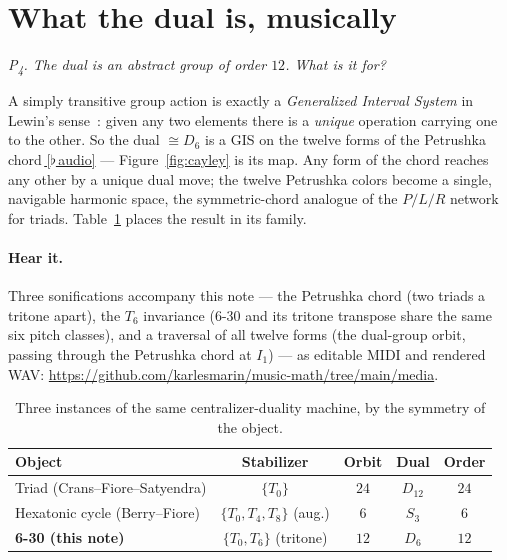 \documentclass[11pt]{article}
\newcommand{\Dgrp}[1]{D_{#1}}
\newcommand{\question}[1]{\smallskip\noindent\textit{#1}\smallskip}
\newcommand{\audiobase}{https://github.com/karlesmarin/music-math/raw/main/media}
\newcommand{\audio}[1]{\href{\audiobase/#1}{\textcolor{ctA}{\footnotesize\,[$\flat$\,audio]}}}
\begin{document}
\section{What the dual is, musically}\label{sec:music}

\question{P\textsubscript{4}. The dual is an abstract group of order $12$. What is it \emph{for}?}

A simply transitive group action is exactly a \emph{Generalized Interval System} in Lewin's
sense~\cite[p.~157]{Lewin}: given any two elements there is a \emph{unique} operation carrying one to the
other. So the dual $\cong\Dgrp{6}$ is a GIS on the twelve forms of the Petrushka chord\,\audio{orbit_12.wav} ---
Figure~\ref{fig:cayley} is its map. Any form of the chord reaches any other by a unique dual move; the
twelve Petrushka colors become a single, navigable harmonic space, the symmetric-chord analogue of the
$P/L/R$ network for triads. Table~\ref{tab:family} places the result in its family.

\paragraph{Hear it.} Three sonifications accompany this note --- the Petrushka chord (two triads a
tritone apart), the $T_6$ invariance (6-30 and its tritone transpose share the same six pitch classes),
and a traversal of all twelve forms (the dual-group orbit, passing through the Petrushka chord at
$I_1$) --- as editable MIDI and rendered WAV:
\url{https://github.com/karlesmarin/music-math/tree/main/media}.

\begin{table}[h]
\centering\small
\setlength{\tabcolsep}{5pt}
\begin{tabular}{@{}lcccc@{}}
\toprule
\rowcolor{ctA!22}
Object & Stabilizer & Orbit & Dual & Order\\
\midrule
Triad (Crans--Fiore--Satyendra) & $\{T_0\}$ & $24$ & $\Dgrp{12}$ & $24$\\
Hexatonic cycle (Berry--Fiore) & $\{T_0,T_4,T_8\}$ (aug.) & $6$ & $S_3$ & $6$\\
\textbf{6-30 (this note)} & $\{T_0,T_6\}$ (tritone) & $12$ & $\Dgrp{6}$ & $12$\\
\bottomrule
\end{tabular}
\caption{Three instances of the same centralizer-duality machine, by the symmetry of the object.}
\label{tab:family}
\end{table}
\end{document}
